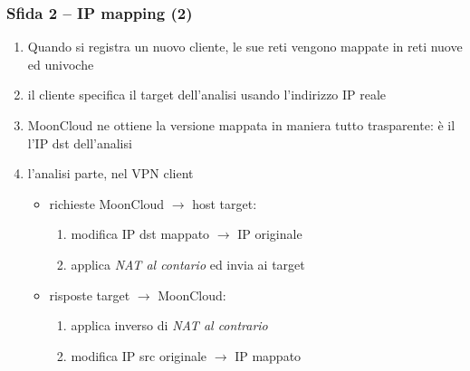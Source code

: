 \begin{frame}
    \frametitle{Sfida 2 -- IP mapping (2)}
    \begin{enumerate}
        \item Quando si registra un nuovo cliente, le sue reti vengono \alert{mappate}
        in reti nuove ed univoche

        \item il cliente specifica il target dell'analisi usando l'indirizzo IP reale
        
        \item MoonCloud ne ottiene la \alert{versione mappata} in maniera tutto
        \alert{trasparente}: è il l'IP dst dell'analisi

        \item l'analisi parte, nel \alert{VPN client}
        \begin{itemize}
            \item richieste MoonCloud $\rightarrow$ host target:
            \begin{enumerate}
                \item modifica IP dst mappato $\rightarrow$ IP originale
                \item applica \textit{NAT al contario} ed invia ai target
            \end{enumerate}
            \item risposte target $\rightarrow$ MoonCloud:
            \begin{enumerate}
                \item applica inverso di \textit{NAT al contrario}
                \item modifica IP src originale $\rightarrow$ IP mappato
            \end{enumerate}
        \end{itemize}



\end{enumerate}
\end{frame}
